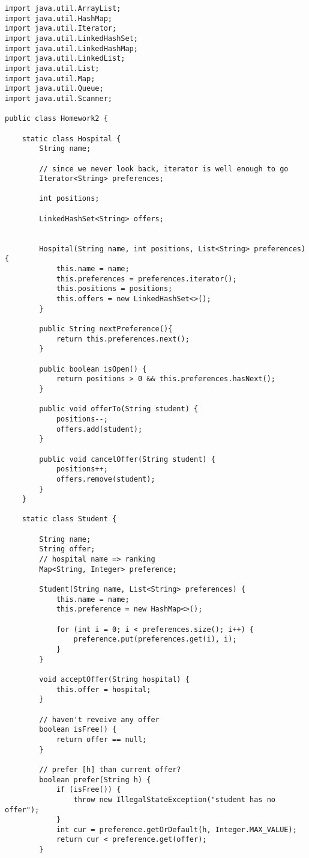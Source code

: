 \documentclass[14pt, a4paper]{article}
\begin{document}
\begin{verbatim}
import java.util.ArrayList;
import java.util.HashMap;
import java.util.Iterator;
import java.util.LinkedHashSet;
import java.util.LinkedHashMap;
import java.util.LinkedList;
import java.util.List;
import java.util.Map;
import java.util.Queue;
import java.util.Scanner;

public class Homework2 {

    static class Hospital {
        String name;
        
        // since we never look back, iterator is well enough to go
        Iterator<String> preferences;

        int positions;

        LinkedHashSet<String> offers;


        Hospital(String name, int positions, List<String> preferences) {
            this.name = name;
            this.preferences = preferences.iterator();
            this.positions = positions;
            this.offers = new LinkedHashSet<>();
        }

        public String nextPreference(){
            return this.preferences.next();
        }

        public boolean isOpen() {
            return positions > 0 && this.preferences.hasNext();
        }

        public void offerTo(String student) {
            positions--;
            offers.add(student);
        }

        public void cancelOffer(String student) {
            positions++;
            offers.remove(student);
        }
    }

    static class Student {

        String name;
        String offer;
        // hospital name => ranking
        Map<String, Integer> preference;

        Student(String name, List<String> preferences) {
            this.name = name;
            this.preference = new HashMap<>();

            for (int i = 0; i < preferences.size(); i++) {
                preference.put(preferences.get(i), i);
            }
        }

        void acceptOffer(String hospital) {
            this.offer = hospital;
        }

        // haven't reveive any offer
        boolean isFree() {
            return offer == null;
        }

        // prefer [h] than current offer?
        boolean prefer(String h) {
            if (isFree()) {
                throw new IllegalStateException("student has no offer");
            }
            int cur = preference.getOrDefault(h, Integer.MAX_VALUE);
            return cur < preference.get(offer);
        }


\end{verbatim}
\end{document}
